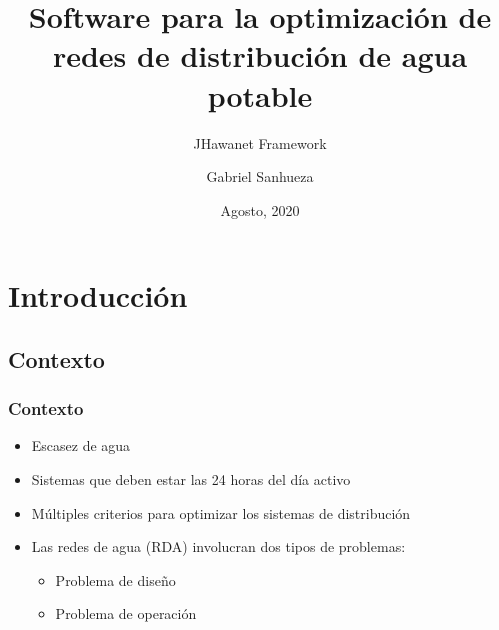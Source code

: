 \documentclass[9pt]{beamer}
\author{Gabriel Sanhueza}
\title[JHawanet Framework]{Software para la optimización de redes de distribución de agua potable}
\subtitle{JHawanet Framework}
\institute [Universidad de Talca]{Defensa de Título\\ Universidad de Talca}
\date{Agosto, 2020}
\begin{document}
    \frame{\titlepage}

    \section{Introducción}

    \subsection{Contexto}
    \begin{frame}
        \frametitle{Contexto}
        \begin{itemize}
            \item Escasez de agua
            \item Sistemas que deben estar las 24 horas del día activo
            \item Múltiples criterios para optimizar los sistemas de distribución
            \item Las redes de agua (RDA) involucran dos tipos de problemas:
            \begin{itemize}
                \item Problema de diseño
                \item Problema de operación
            \end{itemize}
        \end{itemize}
    \end{frame}
\end{document}
